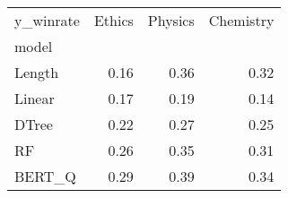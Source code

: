 \begin{tabular}{lrrr}
\toprule
y\_winrate &  Ethics &  Physics &  Chemistry \\
model  &         &          &            \\
\midrule
Length &    0.16 &     0.36 &       0.32 \\
Linear &    0.17 &     0.19 &       0.14 \\
DTree  &    0.22 &     0.27 &       0.25 \\
RF     &    0.26 &     0.35 &       0.31 \\
BERT\_Q &    0.29 &     0.39 &       0.34 \\
\bottomrule
\end{tabular}
